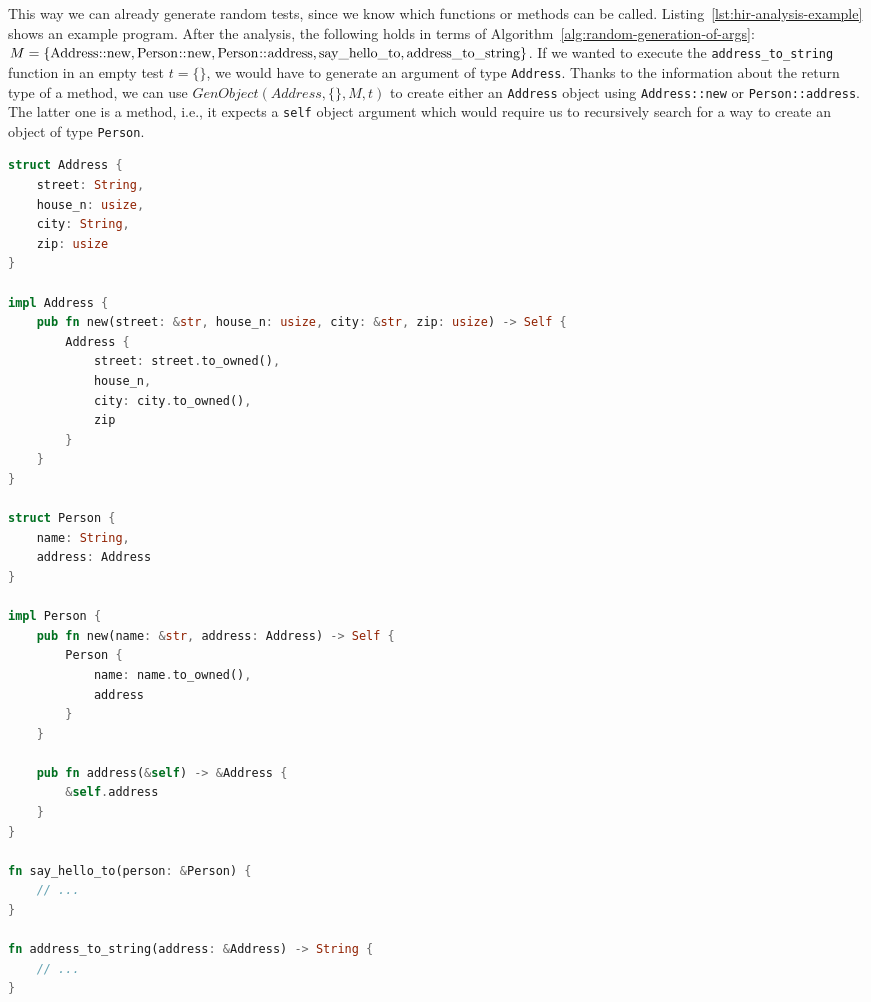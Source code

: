 \documentclass{article}
\begin{document}
This way we can already generate random tests, since we know which functions or methods can be called. Listing~\ref{lst:hir-analysis-example} shows an example program. After the analysis, the following holds in terms of Algorithm~\ref{alg:random-generation-of-args}: $M = \{\lstinline{Address::new}, \lstinline{Person::new}, \lstinline{Person::address}, \lstinline{say_hello_to}, \lstinline{address_to_string}\}$. If we wanted to execute the \lstinline{address_to_string} function in an empty test $t = \{\}$, we would have to generate an argument of type \lstinline{Address}. Thanks to the information about the return type of a method, we can use $GenObject(Address, \{\}, M, t)$ to create either an \lstinline{Address} object using \lstinline{Address::new} or \lstinline{Person::address}. The latter one is a method, i.e., it expects a \lstinline{self} object argument which would require us to recursively search for a way to create an object of type \lstinline{Person}.

\begin{lstlisting}[language=Rust, style=boxed, caption={After HIR analysis, we know how a \lstinline{Person} object can be generated to be used in \lstinline{say_hello_to}.}, label=lst:hir-analysis-example]
struct Address {
    street: String,
    house_n: usize,
    city: String,
    zip: usize
}

impl Address {
    pub fn new(street: &str, house_n: usize, city: &str, zip: usize) -> Self {
        Address {
            street: street.to_owned(),
            house_n,
            city: city.to_owned(),
            zip
        }
    }
}

struct Person {
    name: String,
    address: Address
}

impl Person {
    pub fn new(name: &str, address: Address) -> Self {
        Person {
            name: name.to_owned(),
            address
        }
    }

    pub fn address(&self) -> &Address {
        &self.address
    }
}

fn say_hello_to(person: &Person) {
    // ...
}

fn address_to_string(address: &Address) -> String {
    // ...
}
\end{lstlisting}
\end{document}
